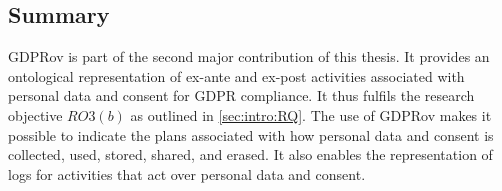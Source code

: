 



\subsection*{Summary}
GDPRov is part of the second major contribution of this thesis. It provides an ontological representation of ex-ante and ex-post activities associated with personal data and consent for GDPR compliance.
It thus fulfils the research objective $RO3(b)$ as outlined in \autoref{sec:intro:RQ}. 
The use of GDPRov makes it possible to indicate the plans associated with how personal data and consent is collected, used, stored, shared, and erased.
It also enables the representation of logs for activities that act over personal data and consent.

